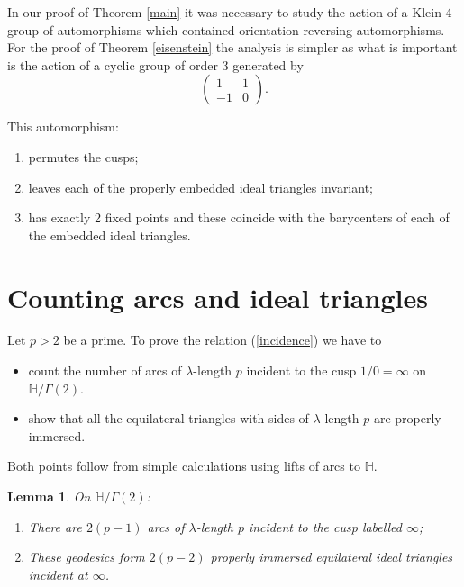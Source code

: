 \documentclass[12pt]{amsart}
\theoremstyle{plain}
\newtheorem{lemma}{Lemma}[section]
\theoremstyle{definition}
\def\HH{\mathbb{H}}
\def\xx{\HH/g2}
\def\g2{\Gamma(2)}
\def\xx{\HH/\g2}
\begin{document}

In our proof of Theorem \ref{main}
it was necessary to study the action of
a Klein 4 group of automorphisms
which contained orientation reversing automorphisms.
For the proof of Theorem \ref{eisenstein}
the analysis is simpler as what is important
is  the action of a
cyclic group of order 3
generated by
$$ \begin{pmatrix}
1 & 1 \\
-1 & 0
\end{pmatrix} .$$

This automorphism:
\begin{enumerate}
\item permutes the cusps;
\item leaves each of the properly embedded  ideal triangles invariant;
\item has exactly 2 fixed points and these coincide with the
	barycenters of each of the embedded ideal triangles.
\end{enumerate}




\section{Counting arcs and ideal triangles}
\label{counting arcs etc}

Let $p> 2$ be a prime. To prove the relation (\ref{incidence})
we have to  
\begin{itemize}
\item count the number 
of arcs of $\lambda$-length $p$
incident to the cusp $1/0 = \infty$ on $\xx$.
\item 
show that all the equilateral triangles with sides of $\lambda$-length $p$ are properly immersed.
\end{itemize}

Both points follow from simple calculations using lifts of
arcs to $\HH$.


\begin{lemma}\label{counting}
On $\xx$:
\begin{enumerate}
\item There are $2(p-1)$ arcs of $\lambda$-length $p$ incident to the cusp labelled  $\infty$;
\item These geodesics form $2(p-2)$ properly  immersed equilateral ideal triangles incident at $\infty$.
\end{enumerate}
\end{lemma}
\end{document}
